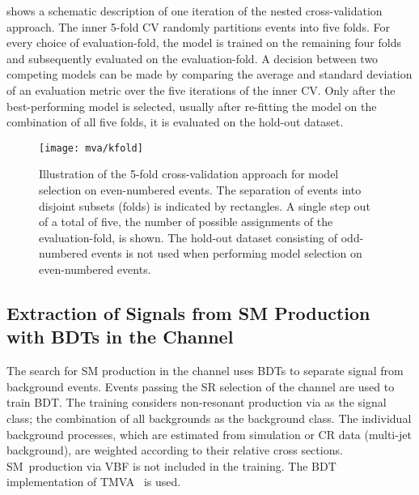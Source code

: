  shows a schematic description of one
iteration of the nested cross-validation approach. The inner 5-fold
CV randomly partitions events into five folds. For every choice of
evaluation-fold, the model is trained on the remaining four folds and
subsequently evaluated on the evaluation-fold. A decision between two
competing models can be made by comparing the average and standard
deviation of an evaluation metric over the five iterations of the inner
CV. Only after the best-performing model is selected, usually after
re-fitting the model on the combination of all five folds, it is
evaluated on the hold-out dataset.

\begin{figure}[htbp]
  \centering

  \texttt{[image: mva/kfold]}

  \caption[Illustration of the 5-fold cross-validation approach for model
  selection.]{Illustration of the 5-fold cross-validation approach for model
    selection on even-numbered events. The separation of events into disjoint
    subsets (folds) is indicated by rectangles. A single step out of a total of
    five, the number of possible assignments of the evaluation-fold, is
    shown. The hold-out dataset consisting of odd-numbered events is not used
    when performing model selection on even-numbered events.}%
  \label{fig:cross_validation}
\end{figure}



\subsection{Extraction of Signals from SM \HH Production with BDTs in
  the \hadhad Channel}%
\label{sec:mva_smbdt}

The search for SM \HH production in the \hadhad channel uses BDTs to separate
signal from background events. Events passing the SR selection
of the \hadhad channel are used to train BDT. The training considers
non-resonant \HH production via \ggF as the signal class; the combination of all
backgrounds as the background class. The individual background processes, which
are estimated from simulation or CR data (multi-jet background), are weighted
according to their relative cross sections. SM~\HH production via VBF is not
included in the training.
The BDT implementation of TMVA~\cite{TMVA} is used.


